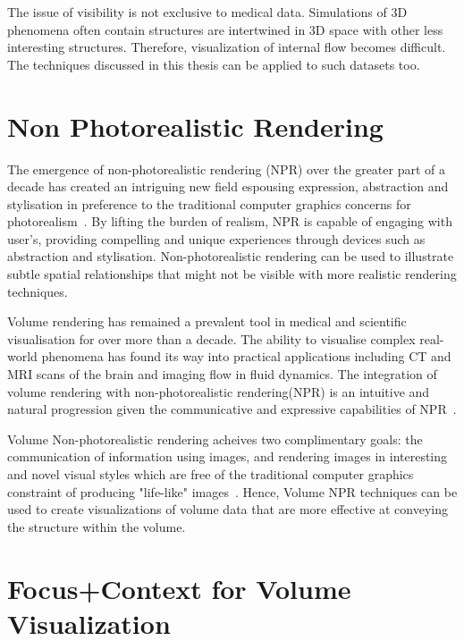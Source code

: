 The issue of visibility is not exclusive to medical data. Simulations of 3D phenomena often contain structures are intertwined in 3D space with other less interesting structures. Therefore, visualization of internal flow becomes difficult. The techniques discussed in this thesis can be applied to such datasets too.


\section{Non Photorealistic Rendering }

The emergence of non-photorealistic rendering (NPR) over the greater part of a decade has created an intriguing new field espousing expression, abstraction and stylisation in preference to the traditional computer graphics concerns for photorealism~\cite{Ebert:2000}. By lifting the burden of realism, NPR is capable of engaging with user\rq s, providing compelling and unique experiences through devices such as abstraction and stylisation. Non-photorealistic rendering can be used to illustrate subtle spatial relationships that might not be visible with more realistic rendering techniques. 

Volume rendering has remained a prevalent tool in medical and scientific visualisation for over more than a decade. The ability to visualise complex real-world phenomena has found its way into practical applications including CT and MRI scans of the brain and imaging flow in fluid dynamics. The integration of volume rendering with non-photorealistic rendering(NPR) is an intuitive and natural progression given the communicative and expressive capabilities of NPR~\cite{Hertzmann:2010}. 

Volume Non-photorealistic rendering acheives two complimentary goals: the communication of information using images, and rendering images in interesting and novel visual styles which are free of the traditional computer graphics constraint of producing "life-like" images~\cite{Elvins:1992}. Hence, Volume NPR techniques can be used to create visualizations of volume data that are more effective at conveying the structure within the volume.

\section{Focus+Context for Volume Visualization }

